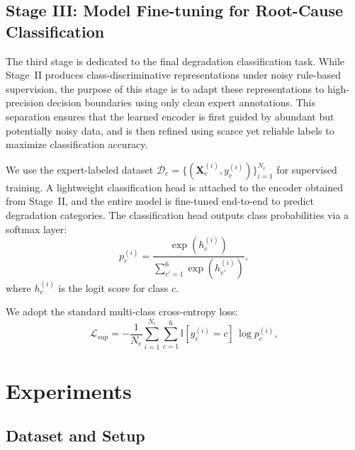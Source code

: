 \documentclass[lettersize,journal]{IEEEtran}
\begin{document}
\subsection{Stage III: Model Fine-tuning for Root-Cause Classification}

The third stage is dedicated to the final degradation classification task. 
While Stage~II produces class-discriminative representations under noisy rule-based supervision, the purpose of this stage is to adapt these representations to high-precision decision boundaries using only clean expert annotations. 
This separation ensures that the learned encoder is first guided by abundant but potentially noisy data, and is then refined using scarce yet reliable labels to maximize classification accuracy.

We use the expert-labeled dataset 
$\mathcal{D}_e = \{(\mathbf{X}_e^{(i)}, y_e^{(i)})\}_{i=1}^{N_e}$ 
for supervised training. 
A lightweight classification head is attached to the encoder obtained from Stage~II, and the entire model is fine-tuned end-to-end to predict degradation categories. 
The classification head outputs class probabilities via a softmax layer:
\begin{equation}
p_c^{(i)} = \frac{\exp(h_c^{(i)})}{\sum_{c'=1}^6 \exp(h_{c'}^{(i)})},
\end{equation}
where $h_c^{(i)}$ is the logit score for class $c$.

We adopt the standard multi-class cross-entropy loss:
\begin{equation}
\mathcal{L}_{sup} = -\frac{1}{N_e} \sum_{i=1}^{N_e} \sum_{c=1}^6 
\mathbb{I}[y_e^{(i)} = c] \, \log p_c^{(i)},
\end{equation}


\section{Experiments}
\label{sec:experiments}

\subsection{Dataset and Setup}
\end{document}
